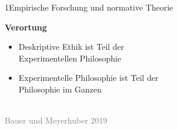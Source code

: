 \documentclass[xcolor=table,9pt,aspectratio=169]{beamer}
\begin{document}
\begin{frame}{\vspace*{10mm}1\hspace*{1em}Empirische Forschung und normative Theorie}
\begin{multicols}{2}
   \textbf{Verortung}\\
   \medskip
   \begin{itemize}
      \item Deskriptive Ethik ist Teil der\\Experimentellen Philosophie
      \item Experimentelle Philosophie ist Teil der\\Philosophie im Ganzen
   \end{itemize}
   \vfill
   \begin{center}
      \\
      \textcolor{gray}{Bauer und Meyerhuber 2019}
   \end{center}
\end{multicols}
\end{frame}
\end{document}
